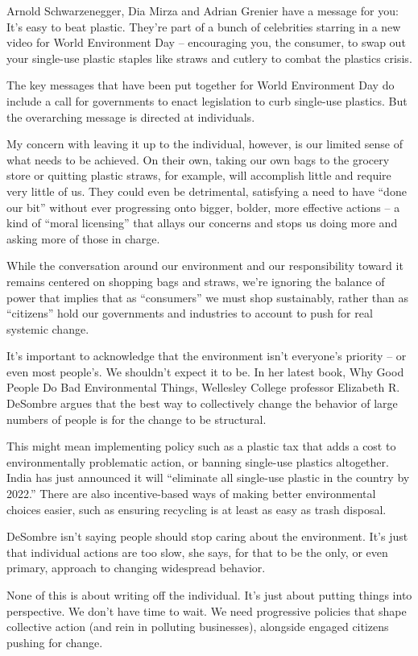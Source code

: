 Arnold Schwarzenegger, Dia Mirza and Adrian Grenier have a message for you: It's easy to beat plastic. They're part of a bunch of celebrities starring in a new video for World Environment Day – encouraging you, the consumer, to swap out your single-use plastic staples like straws and cutlery to combat the plastics crisis.


The key messages that have been put together for World Environment Day do include a call for governments to enact legislation to curb single-use plastics. But the overarching message is directed at individuals.


My concern with leaving it up to the individual, however, is our limited sense of what needs to be achieved. On their own, taking our own bags to the grocery store or quitting plastic straws, for example, will accomplish little and require very little of us. They could even be detrimental, satisfying a need to have ``done our bit'' without ever progressing onto bigger, bolder, more effective actions – a kind of ``moral licensing'' that allays our concerns and stops us doing more and asking more of those in charge.


While the conversation around our environment and our responsibility toward it remains centered on shopping bags and straws, we're ignoring the balance of power that implies that as ``consumers'' we must shop sustainably, rather than as ``citizens'' hold our governments and industries to account to push for real systemic change.


It's important to acknowledge that the environment isn't everyone's priority – or even most people's. We shouldn't expect it to be. In her latest book, Why Good People Do Bad Environmental Things, Wellesley College professor Elizabeth R. DeSombre argues that the best way to collectively change the behavior of large numbers of people is for the change to be structural.


This might mean implementing policy such as a plastic tax that adds a cost to environmentally problematic action, or banning single-use plastics altogether. India has just announced it will ``eliminate all single-use plastic in the country by 2022.'' There are also incentive-based ways of making better environmental choices easier, such as ensuring recycling is at least as easy as trash disposal.


DeSombre isn't saying people should stop caring about the environment. It's just that individual actions are too slow, she says, for that to be the only, or even primary, approach to changing widespread behavior.


None of this is about writing off the individual. It's just about putting things into perspective. We don't have time to wait. We need progressive policies that shape collective action (and rein in polluting businesses), alongside engaged citizens pushing for change.
